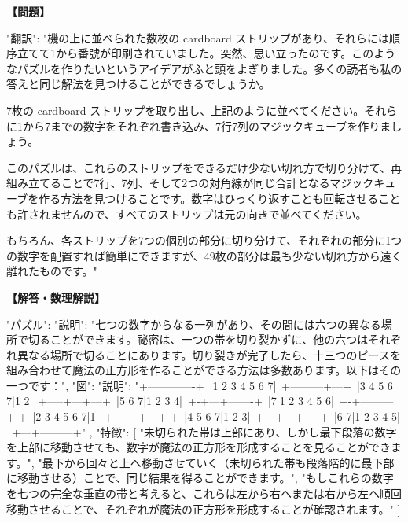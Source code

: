 \documentclass[10pt,a4paper,oneside,openany]{ltjsbook}
\begin{document}
\begin{tcolorbox}[colback=softblue,colframe=primaryblue,title=\textbf{第 400 問：THE MAGIC STRIPS.},arc=2mm,boxrule=1pt,breakable]
\textbf{【問題】}\par\vspace{0.3em}
{
  "翻訳": "機の上に並べられた数枚の cardboard ストリップがあり、それらには順序立てて1から番號が印刷されていました。突然、思い立ったのです。このようなパズルを作りたいというアイデアがふと頭をよぎりました。多くの読者も私の答えと同じ解法を見つけることができるでしょうか。

7枚の cardboard ストリップを取り出し、上記のように並べてください。それらに1から7までの数字をそれぞれ書き込み、7行7列のマジックキューブを作りましょう。

このパズルは、これらのストリップをできるだけ少ない切れ方で切り分けて、再組み立てることで7行、7列、そして2つの対角線が同じ合計となるマジックキューブを作る方法を見つけることです。数字はひっくり返すことも回転させることも許されませんので、すべてのストリップは元の向きで並べてください。

もちろん、各ストリップを7つの個別の部分に切り分けて、それぞれの部分に1つの数字を配置すれば簡単にできますが、49枚の部分は最も少ない切れ方から遠く離れたものです。"
}
\tcblower
\textbf{【解答・数理解説】}\par\vspace{0.3em}
{
  "パズル": {
    "説明": "七つの数字からなる一列があり、その間には六つの異なる場所で切ることができます。祕密は、一つの帯を切り裂かずに、他の六つはそれぞれ異なる場所で切ることにあります。切り裂きが完了したら、十三つのピースを組み合わせて魔法の正方形を作ることができる方法は多数あります。以下はその一つです：",
    "図": {
      "説明": "+-------------+\
|1 2 3 4 5 6 7|\
+---------+---+\
|3 4 5 6 7|1 2|\
+-----+---+---+\
|5 6 7|1 2 3 4|\
+-+---+-------+\
|7|1 2 3 4 5 6|\
+-+---------+-+\
|2 3 4 5 6 7|1|\
+-------+---+-+\
|4 5 6 7|1 2 3|\
+---+---+-----+\
|6 7|1 2 3 4 5|\
+---+---------+"
    },
    "特徴": [
      "未切られた帯は上部にあり、しかし最下段落の数字を上部に移動させても、数字が魔法の正方形を形成することを見ることができます。",
      "最下から回々と上へ移動させていく（未切られた帯も段落階的に最下部に移動させる）ことで、同じ結果を得ることができます。",
      "もしこれらの数字を七つの完全な垂直の帯と考えると、これらは左から右へまたは右から左へ順回移動させることで、それぞれが魔法の正方形を形成することが確認されます。"
    ]
  }
}
\end{tcolorbox}
\end{document}
